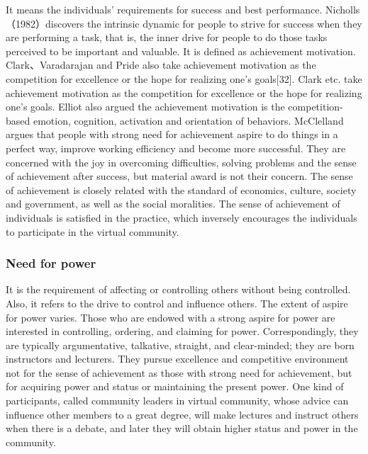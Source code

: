\documentclass{elsarticle}
\begin{document}
 It means the individuals’ requirements for
success and best performance. Nicholls（1982）discovers the intrinsic
dynamic for people to strive for success when they are performing a
task, that is, the inner drive for people to do those tasks perceived
to be important and valuable. It is defined as achievement
motivation. Clark、Varadarajan and Pride also take achievement
motivation as the competition for excellence or the hope for realizing
one’s goals[32]. Clark etc. take achievement motivation as the competition for
excellence or the hope for realizing one’s goals\cite{clark1994emc}. 
Elliot also argued  the achievement motivation is the
competition-based emotion, cognition, activation and orientation of
behaviors\cite{elliot1999aaa}.  McClelland argues that people
with strong need for achievement aspire to do things in a perfect way,
improve working efficiency and become more successful\cite{mcclelland1976am}. They are
concerned with the joy in overcoming difficulties, solving problems
and the sense of achievement after success, but material award is not
their concern. The sense of achievement is closely related with the
standard of economics, culture, society and government, as well as the
social moralities. The sense of achievement of individuals is
satisfied in the practice, which inversely encourages the individuals
to participate in the virtual community. 

\subsubsection{ Need for power}
\label{sec:need-power}

It is the requirement of affecting or controlling
others without being controlled. Also, it refers to the drive to
control and influence others. The extent of aspire for power
varies. Those who are endowed with a strong aspire for power are
interested in controlling, ordering, and claiming for
power. Correspondingly, they are typically argumentative, talkative,
straight, and clear-minded; they are born instructors and
lecturers. They pursue excellence and competitive environment not for
the sense of achievement as those with strong need for achievement,
but for acquiring power and status or maintaining the present
power. One kind of participants, called community leaders in virtual
community, whose advice can influence other members to a great degree,
will make lectures and instruct others when there is a debate, and
later they will obtain higher status and power in the community. 
\end{document}
